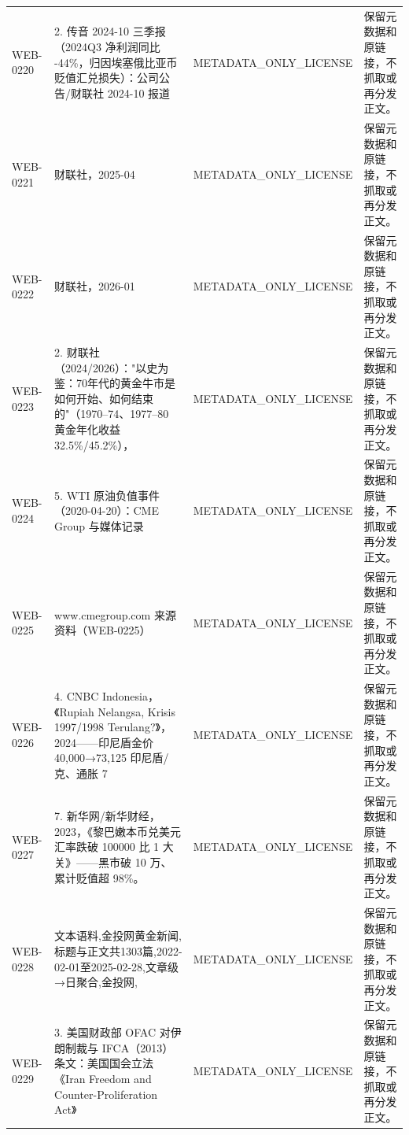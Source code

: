 \documentclass[UTF8,openany,oneside,11pt]{ctexbook}
\begin{document}
\begin{longtable}{L{1.5cm}L{5.5cm}L{3cm}L{5cm}}
WEB-\allowbreak{}0220 & 2. 传音 2024-\allowbreak{}10 三季报（2024Q3 净利润同比 -\allowbreak{}44\%，归因埃塞俄比亚币贬值汇兑损失）：公司公告/\allowbreak{}财联社 2024-\allowbreak{}10 报道 & METADATA\_\allowbreak{}ONLY\_\allowbreak{}LICENSE & 保留元数据和原链接，不抓取或再分发正文。 \\
WEB-\allowbreak{}0221 & 财联社，2025-\allowbreak{}04 & METADATA\_\allowbreak{}ONLY\_\allowbreak{}LICENSE & 保留元数据和原链接，不抓取或再分发正文。 \\
WEB-\allowbreak{}0222 & 财联社，2026-\allowbreak{}01 & METADATA\_\allowbreak{}ONLY\_\allowbreak{}LICENSE & 保留元数据和原链接，不抓取或再分发正文。 \\
WEB-\allowbreak{}0223 & 2. 财联社（2024/\allowbreak{}2026）："以史为鉴：70年代的黄金牛市是如何开始、如何结束的"（1970–74、1977–80 黄金年化收益 32.5\%/\allowbreak{}45.2\%）， & METADATA\_\allowbreak{}ONLY\_\allowbreak{}LICENSE & 保留元数据和原链接，不抓取或再分发正文。 \\
WEB-\allowbreak{}0224 & 5. WTI 原油负值事件（2020-\allowbreak{}04-\allowbreak{}20）：CME Group 与媒体记录 & METADATA\_\allowbreak{}ONLY\_\allowbreak{}LICENSE & 保留元数据和原链接，不抓取或再分发正文。 \\
WEB-\allowbreak{}0225 & www.cmegroup.com 来源资料（WEB-\allowbreak{}0225） & METADATA\_\allowbreak{}ONLY\_\allowbreak{}LICENSE & 保留元数据和原链接，不抓取或再分发正文。 \\
WEB-\allowbreak{}0226 & 4. CNBC Indonesia，《Rupiah Nelangsa,\allowbreak{} Krisis 1997/\allowbreak{}1998 Terulang?》，2024——印尼盾金价 40,\allowbreak{}000→73,\allowbreak{}125 印尼盾/\allowbreak{}克、通胀 7 & METADATA\_\allowbreak{}ONLY\_\allowbreak{}LICENSE & 保留元数据和原链接，不抓取或再分发正文。 \\
WEB-\allowbreak{}0227 & 7. 新华网/\allowbreak{}新华财经，2023，《黎巴嫩本币兑美元汇率跌破 100000 比 1 大关》——黑市破 10 万、累计贬值超 98\%。 & METADATA\_\allowbreak{}ONLY\_\allowbreak{}LICENSE & 保留元数据和原链接，不抓取或再分发正文。 \\
WEB-\allowbreak{}0228 & 文本语料,\allowbreak{}金投网黄金新闻,\allowbreak{}标题与正文共1303篇,\allowbreak{}2022-\allowbreak{}02-\allowbreak{}01至2025-\allowbreak{}02-\allowbreak{}28,\allowbreak{}文章级→日聚合,\allowbreak{}金投网,\allowbreak{} & METADATA\_\allowbreak{}ONLY\_\allowbreak{}LICENSE & 保留元数据和原链接，不抓取或再分发正文。 \\
WEB-\allowbreak{}0229 & 3. 美国财政部 OFAC 对伊朗制裁与 IFCA（2013）条文：美国国会立法《Iran Freedom and Counter-\allowbreak{}Proliferation Act》 & METADATA\_\allowbreak{}ONLY\_\allowbreak{}LICENSE & 保留元数据和原链接，不抓取或再分发正文。 \\

\end{longtable}
\end{document}
